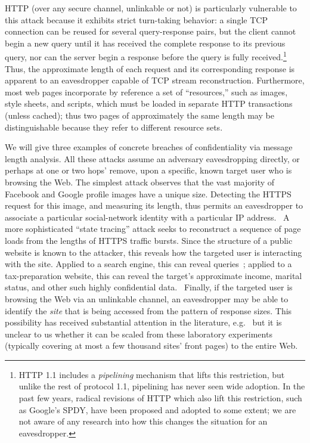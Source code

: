\documentclass[oneside,tinymargin]{zarticle}
\begin{document}
\begin{multicols}{2}
HTTP (over any secure channel, unlinkable or not) is particularly
vulnerable to this attack because it exhibits strict turn-taking
behavior: a single TCP connection can be reused for several
query-response pairs, but the client cannot begin a new query until it
has received the complete response to its previous query, nor can the
server begin a response before the query is fully
received.\footnote{HTTP 1.1 includes a \emph{pipelining} mechanism
  that lifts this restriction, but unlike the rest of protocol 1.1,
  pipelining has never seen wide adoption.  In the past few years,
  radical revisions of HTTP which also lift this restriction, such as
  Google's SPDY, have been proposed and adopted to some extent; we are
  not aware of any research into how this changes the situation for an
  eavesdropper.}  Thus, the approximate length of each request and its
corresponding response is apparent to an eavesdropper capable of TCP
stream reconstruction.  Furthermore, most web pages incorporate by
reference a set of “resources,” such as images, style sheets, and
scripts, which must be loaded in separate HTTP transactions (unless
cached); thus two pages of approximately the same length may be
distinguishable because they refer to different resource sets.

We will give three examples of concrete breaches of confidentiality
via message length analysis.  All these attacks assume an adversary
eavesdropping directly, or perhaps at one or two hops' remove, upon a
specific, known target user who is browsing the Web.  The simplest
attack observes that the vast majority of Facebook and Google profile
images have a unique size.  Detecting the HTTPS request for this
image, and measuring its length, thus permits an eavesdropper to
associate a particular social-network identity with a particular IP
address.~\cite{herrmann2012analyzing, pironti2012identifying} A more
sophisticated “state tracing” attack seeks to reconstruct a sequence
of page loads from the lengths of HTTPS traffic bursts.  Since the
structure of a public website is known to the attacker, this reveals
how the targeted user is interacting with the site.  Applied to a
search engine, this can reveal queries~\cite{castelluccia2010private};
applied to a tax-preparation website, this can reveal the target's
approximate income, marital status, and other such highly confidential
data.~\cite{zhang2010sidebuster} Finally, if the targeted user is
browsing the Web via an unlinkable channel, an eavesdropper may be
able to identify the \emph{site} that is being accessed from the
pattern of response sizes.  This possibility has received substantial
attention in the literature, e.g.~\cite{cai2012touching,
  cheng1998traffic, coull2007web, dyer2012peekaboo} but it is unclear
to us whether it can be scaled from these laboratory experiments
(typically covering at most a few thousand sites' front pages) to the
entire Web.


\end{multicols}
\end{document}
